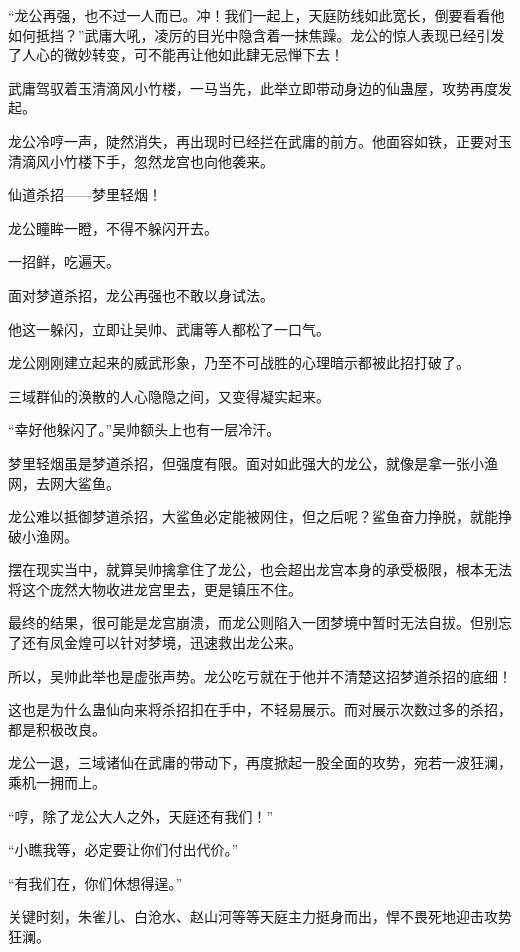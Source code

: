 
\begin{this_body}



“龙公再强，也不过一人而已。冲！我们一起上，天庭防线如此宽长，倒要看看他如何抵挡？”武庸大吼，凌厉的目光中隐含着一抹焦躁。龙公的惊人表现已经引发了人心的微妙转变，可不能再让他如此肆无忌惮下去！

武庸驾驭着玉清滴风小竹楼，一马当先，此举立即带动身边的仙蛊屋，攻势再度发起。

龙公冷哼一声，陡然消失，再出现时已经拦在武庸的前方。他面容如铁，正要对玉清滴风小竹楼下手，忽然龙宫也向他袭来。

仙道杀招——梦里轻烟！

龙公瞳眸一瞪，不得不躲闪开去。

一招鲜，吃遍天。

面对梦道杀招，龙公再强也不敢以身试法。

他这一躲闪，立即让吴帅、武庸等人都松了一口气。

龙公刚刚建立起来的威武形象，乃至不可战胜的心理暗示都被此招打破了。

三域群仙的涣散的人心隐隐之间，又变得凝实起来。

“幸好他躲闪了。”吴帅额头上也有一层冷汗。

梦里轻烟虽是梦道杀招，但强度有限。面对如此强大的龙公，就像是拿一张小渔网，去网大鲨鱼。

龙公难以抵御梦道杀招，大鲨鱼必定能被网住，但之后呢？鲨鱼奋力挣脱，就能挣破小渔网。

摆在现实当中，就算吴帅擒拿住了龙公，也会超出龙宫本身的承受极限，根本无法将这个庞然大物收进龙宫里去，更是镇压不住。

最终的结果，很可能是龙宫崩溃，而龙公则陷入一团梦境中暂时无法自拔。但别忘了还有凤金煌可以针对梦境，迅速救出龙公来。

所以，吴帅此举也是虚张声势。龙公吃亏就在于他并不清楚这招梦道杀招的底细！

这也是为什么蛊仙向来将杀招扣在手中，不轻易展示。而对展示次数过多的杀招，都是积极改良。

龙公一退，三域诸仙在武庸的带动下，再度掀起一股全面的攻势，宛若一波狂澜，乘机一拥而上。

“哼，除了龙公大人之外，天庭还有我们！”

“小瞧我等，必定要让你们付出代价。”

“有我们在，你们休想得逞。”

关键时刻，朱雀儿、白沧水、赵山河等等天庭主力挺身而出，悍不畏死地迎击攻势狂澜。


\end{this_body}
